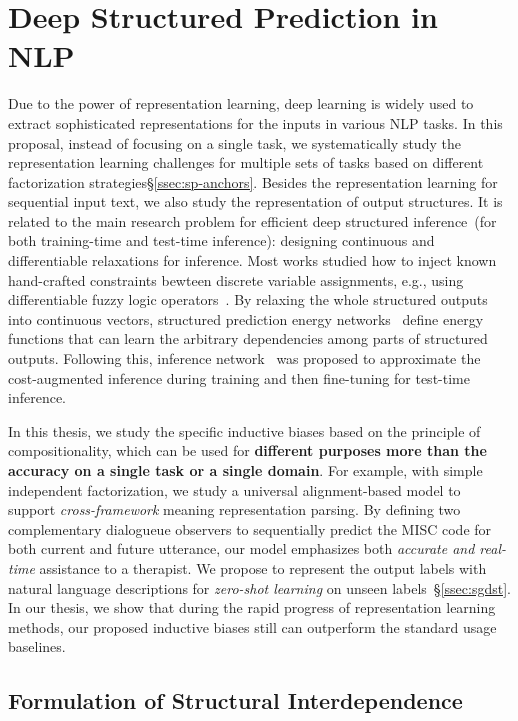 \section{Deep Structured Prediction in NLP}
\label{sec:background:deepsp}
Due to the power of representation learning, deep learning is widely
used to extract sophisticated representations for the inputs in
various NLP tasks. In this proposal, instead of focusing on a single
task, we systematically study the representation learning challenges
for multiple sets of tasks based on different factorization
strategies\S\ref{ssec:sp-anchors}. Besides the representation learning
for sequential input text, we also study the representation of output
structures. It is related to the main research problem for efficient
deep structured inference~(for both training-time and test-time
inference): designing continuous and differentiable relaxations for
 inference. Most works studied how to inject known
hand-crafted constraints bewteen discrete variable assignments, e.g.,
using differentiable fuzzy logic
operators~\citet{li2019augmenting}. By relaxing the whole structured
outputs into continuous vectors, structured prediction energy
networks~\cite[SPEN,][]{belanger2016structured} define energy
functions that can learn the arbitrary dependencies among parts of
structured outputs. Following this, inference
network~\cite{tu2018learning} was proposed to approximate the
cost-augmented inference during training and then fine-tuning for
test-time inference.

In this thesis, we study the specific inductive biases based on the
principle of compositionality, which can be used for \textbf{different
  purposes more than the accuracy on a single task or a single
  domain}. For example, with simple independent factorization, we
study a universal alignment-based model to support
\textit{cross-framework} meaning representation parsing. By defining
two complementary dialogueue observers to sequentially predict the
MISC code for both current and future utterance, our model emphasizes
both \textit{accurate and real-time} assistance to a therapist. We
propose to represent the output labels with natural language
descriptions for \textit{zero-shot learning} on unseen
labels~\S\ref{ssec:sgdst}. In our thesis, we show that during the
rapid progress of representation learning methods, our proposed
inductive biases still can outperform the standard usage baselines.


\subsection{Formulation of Structural Interdependence}

